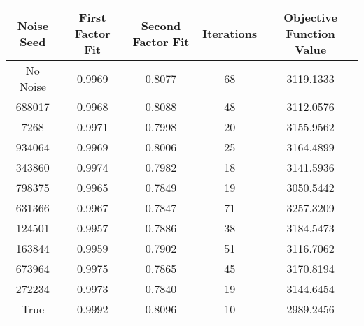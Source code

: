 \begin{tabular}{ccccc}
   
Noise Seed & First Factor Fit & Second Factor Fit & Iterations & Objective Function Value \\
 \hline
No Noise & 0.9969 & 0.8077 &    68 & 3119.1333 \\ 
  688017 & 0.9968 & 0.8088 &    48 & 3112.0576 \\ 
  7268 & 0.9971 & 0.7998 &    20 & 3155.9562 \\ 
  934064 & 0.9969 & 0.8006 &    25 & 3164.4899 \\ 
  343860 & 0.9974 & 0.7982 &    18 & 3141.5936 \\ 
  798375 & 0.9965 & 0.7849 &    19 & 3050.5442 \\ 
  631366 & 0.9967 & 0.7847 &    71 & 3257.3209 \\ 
  124501 & 0.9957 & 0.7886 &    38 & 3184.5473 \\ 
  163844 & 0.9959 & 0.7902 &    51 & 3116.7062 \\ 
  673964 & 0.9975 & 0.7865 &    45 & 3170.8194 \\ 
  272234 & 0.9973 & 0.7840 &    19 & 3144.6454 \\ 
  True & 0.9992 & 0.8096 &    10 & 2989.2456 \\ 
  \end{tabular}
